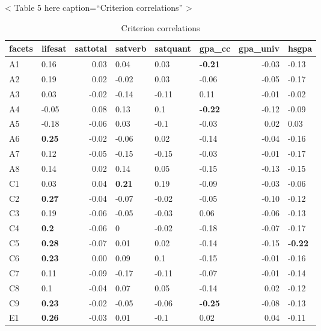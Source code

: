 \documentclass[man]{apa6}
\theoremstyle{definition}
\theoremstyle{definition}
\theoremstyle{definition}
\theoremstyle{remark}
\begin{document}
\vspace{5mm}

\textless{} Table 5 here caption=\enquote{Criterion correlations}
\textgreater{}

\vspace{5mm}

\begin{table}[ht]
\centering
\caption{Criterion correlations} 
\begingroup\fontsize{9.5pt}{9pt}\selectfont
\begin{tabular}{llrlllrl}
  \hline
facets & lifesat & sattotal & satverb & satquant & gpa\_cc & gpa\_univ & hsgpa \\ 
  \hline
A1 & 0.16 & 0.03 & 0.04 & 0.03 & \textbf{-0.21} & -0.03 & -0.13 \\ 
  A2 & 0.19 & 0.02 & -0.02 & 0.03 & -0.06 & -0.05 & -0.17 \\ 
  A3 & 0.03 & -0.02 & -0.14 & -0.11 & 0.11 & -0.01 & -0.02 \\ 
  A4 & -0.05 & 0.08 & 0.13 & 0.1 & \textbf{-0.22} & -0.12 & -0.09 \\ 
  A5 & -0.18 & -0.06 & 0.03 & -0.1 & -0.03 & 0.02 & 0.03 \\ 
  A6 & \textbf{0.25} & -0.02 & -0.06 & 0.02 & -0.14 & -0.04 & -0.16 \\ 
  A7 & 0.12 & -0.05 & -0.15 & -0.15 & -0.03 & -0.01 & -0.17 \\ 
  A8 & 0.14 & 0.02 & 0.14 & 0.05 & -0.15 & -0.13 & -0.15 \\ 
  C1 & 0.03 & 0.04 & \textbf{0.21} & 0.19 & -0.09 & -0.03 & -0.06 \\ 
  C2 & \textbf{0.27} & -0.04 & -0.07 & -0.02 & -0.05 & -0.10 & -0.12 \\ 
  C3 & 0.19 & -0.06 & -0.05 & -0.03 & 0.06 & -0.06 & -0.13 \\ 
  C4 & \textbf{0.2} & -0.06 & 0 & -0.02 & -0.18 & -0.07 & -0.17 \\ 
  C5 & \textbf{0.28} & -0.07 & 0.01 & 0.02 & -0.14 & -0.15 & \textbf{-0.22} \\ 
  C6 & \textbf{0.23} & 0.00 & 0.09 & 0.1 & -0.15 & -0.01 & -0.16 \\ 
  C7 & 0.11 & -0.09 & -0.17 & -0.11 & -0.07 & -0.01 & -0.14 \\ 
  C8 & 0.1 & -0.04 & 0.07 & 0.05 & -0.14 & 0.02 & -0.12 \\ 
  C9 & \textbf{0.23} & -0.02 & -0.05 & -0.06 & \textbf{-0.25} & -0.08 & -0.13 \\ 
  E1 & \textbf{0.26} & -0.03 & 0.01 & -0.1 & 0.02 & 0.04 & -0.11 \\ 

\end{tabular}
\end{table}
\end{document}
